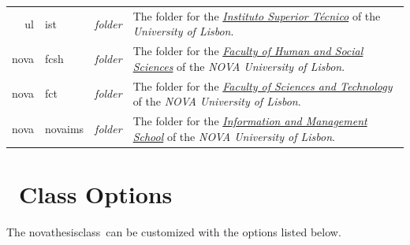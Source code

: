\noindent
\bgroup
{}
\begin{tabularx}{\linewidth}{>{\ttfamily}r@{~/~}>{\ttfamily}l>{\itshape}l>{\upshape}X}
ul     & ist    & folder  &
The folder for the \href{http://www.tecnico.ulisboa.pt}{\emph{Instituto Superior Técnico}} of the \emph{University of Lisbon}.
\\
nova    & fcsh   & folder  &
The folder for the \href{http:www.fcsh.unl.pt}{\emph{Faculty of Human and Social Sciences}}  of the \emph{NOVA University of Lisbon}.
\\
nova    & fct    & folder  &
The folder for the \href{http:www.fct.unl.pt}{\emph{Faculty of Sciences and Technology}} of the \emph{NOVA University of Lisbon}.
\\
nova    & novaims    & folder  &
The folder for the \href{http:www.novaims.unl.pt}{\emph{Information and Management School}} of the \emph{NOVA University of Lisbon}.
\\
\end{tabularx}
\egroup


\section{\ Class Options}
\label{sec:package_options}

The \gls{novathesisclass}\ can be customized with the options listed below.

\newcommand{\classoption}[3]{\textbf{#1=OPT}\qquad #2\\\qquad\emph{#3}\\}

